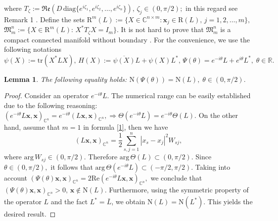 \documentclass[a4paper,twoside,12pt]{article}
\newtheorem{lemma}{Lemma}
\begin{document}
where
$
T_{\zeta}:=\mathfrak{Re}\left( D\, \mathrm{diag}\{e^{i\zeta_{1}}, e^{i\zeta_{2}},\dots,e^{i\zeta_{n}}\} \right), \,\zeta_{j}  \in (0,\pi/2);
$
in this regard see Remark 1  \cite{KABaChu26}.
Define the sets
$
\mathrm{R}^{m}\!(L):=\{X\in \mathbb{C}^{n\times m}:  \mathbf{x}_{j}\in\mathrm{R}(L),\,j=1,2,\dots,m \},$  $\mathfrak{M}^{n}_{m}:=\{ X\in \mathrm{R}^{m}(L):\,X^{\ast}T_{\zeta}X=I_{m}\}.
$
It is not hard to prove that   $\mathfrak{M}^{n}_{m}$ is a compact connected   manifold without boundary \cite{KABaChu26}.
For the convenience, we use the following notations
$$
\psi(X):=\mathrm{tr}(X^{\ast}LX),  \,H(X):= \overline{\psi (X)}L+\psi(X) L^{\ast},\,\Psi(\theta)=e^{-i\theta}L+e^{i\theta}L^{\ast},\;\theta\in \mathbb{R}.
$$
\begin{lemma}\label{L1}The following equality holds:
$
\mathrm{N}(\Psi(\theta))=\mathrm{N}(L),\;\theta\in (0,\pi/2).
$
\end{lemma}
\begin{proof}
Consider     an operator $e^{-i\theta}L.$ The  numerical range  can be easily established due to the following reasoning:
$
(e^{-i\theta}L\mathbf{x},\mathbf{x})_{\mathbb{C}^{n}}=e^{-i\theta}(L\mathbf{x},\mathbf{x})_{\mathbb{C}^{n}},\Rightarrow \Theta(e^{-i\theta}L)=e^{-i\theta}\Theta(L).
$
On the other hand, assume that $m=1$ in formula \eqref{1}, then we have
$$
        ( L\mathbf{x} ,       \mathbf{x} )_{\mathbb{C}^{n}} =\frac{1}{2} \sum\limits_{s,j=1}^{n}|x_{s}-x_{j}| ^{2}W_{sj},
$$
where $\mathrm{arg}\,W_{sj}\in (0,\pi/2).$
Therefore $\mathrm{arg }\,  \Theta(L)\subset (0,\pi/2).$
Since $\theta\in (0,\pi/2),$ it follows that     $\mathrm{arg}\, \Theta(e^{-i\theta}L)\subset (-\pi/2,\pi/2).$ Taking into account
$
(\Psi(\theta)\mathbf{x},\mathbf{x})_{\mathbb{C}^{n}}=2\mathrm{Re} (e^{-i\theta}L\mathbf{x},\mathbf{x})_{\mathbb{C}^{n}},
$
we conclude that
$
 (\Psi(\theta)\mathbf{x},\mathbf{x})_{\mathbb{C}^{n}}>0,\, \mathbf{x}\notin \mathrm{N}(L).
$
Furthermore, using the symmetric property of the operator $L$ and the fact  $L^{\ast}=\bar{L}$, we obtain   $\mathrm{N}(L)=\mathrm{N}(L^{\ast}).$
This yields the desired result.
\end{proof}
\end{document}

